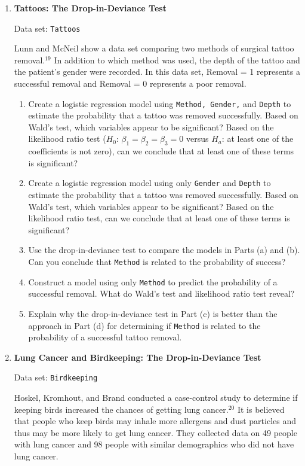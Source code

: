 \documentclass[
]{book}
\begin{document}
\begin{enumerate}
  \item \textbf{Tattoos: The Drop-in-Deviance Test}

Data set: \texttt{Tattoos}

Lunn and McNeil show a data set comparing two methods of surgical tattoo removal.$^{19}$ In addition to which method was used, the depth of the tattoo and the patient’s gender were recorded. In this data set, Removal = 1 represents a successful removal and Removal = 0 represents a poor removal.

  \begin{enumerate}
    \item Create a logistic regression model using \texttt{Method, Gender,} and \texttt{Depth} to estimate the probability that a tattoo was removed successfully. Based on Wald’s test, which variables appear to be significant? Based on the likelihood ratio test ($H_0$: $\beta_1 = \beta_2 = \beta_3 = 0$ versus $H_a$: at least one of the coefficients is not zero), can we conclude that at least one of these terms is significant?
    \item Create a logistic regression model using only \texttt{Gender} and \texttt{Depth} to estimate the probability that a tattoo was removed successfully. Based on Wald’s test, which variables appear to be significant? Based on the likelihood ratio test, can we conclude that at least one of these terms is significant?
    \item Use the drop-in-deviance test to compare the models in Parts (a) and (b). Can you conclude that \texttt{Method} is related to the probability of success?
    \item Construct a model using only \texttt{Method} to predict the probability of a successful removal. What do Wald’s test and likelihood ratio test reveal?
    \item Explain why the drop-in-deviance test in Part (c) is better than the approach in Part (d) for determining if \texttt{Method} is related to the probability of a successful tattoo removal.
  \end{enumerate}

  \item \textbf{Lung Cancer and Birdkeeping: The Drop-in-Deviance Test}

Data set: \texttt{Birdkeeping}

Hoskel, Kromhout, and Brand conducted a case-control study to determine if keeping birds increased the chances of getting lung cancer.$^{20}$ It is believed that people who keep birds may inhale more allergens and dust particles and thus may be more likely to get lung cancer. They collected data on 49 people with lung cancer and 98 people with similar demographics who did not have lung cancer.


\end{enumerate}
\end{document}
